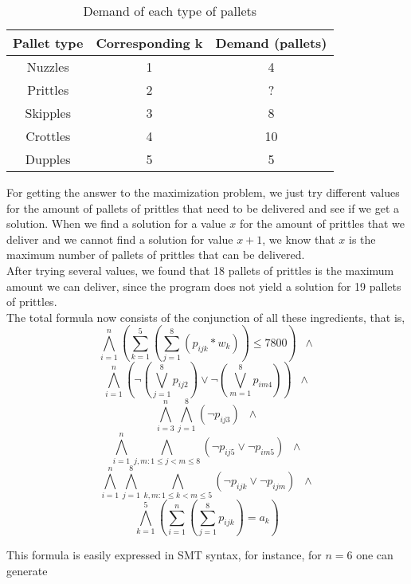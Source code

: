 \documentclass[a4paper]{article}
\begin{document}
\begin{table}[H]
\centering
\caption{Demand of each type of pallets}
\label{my-label}
\begin{tabular}{c|c|c}
\textbf{Pallet type} & \textbf{Corresponding k} & \textbf{Demand (pallets)} \\ \hline
Nuzzles              & 1                        & 4                  		\\ \hline
Prittles             & 2                        & ?                  		\\ \hline
Skipples             & 3                        & 8                 		\\ \hline
Crottles             & 4                        & 10                 		\\ \hline
Dupples              & 5                        & 5                 
\end{tabular}
\end{table}

For getting the answer to the maximization problem, we just try different values for the amount of pallets of prittles that need to be delivered and see if we get a solution. When we find a solution for a value $x$ for the amount of prittles that we deliver and we cannot find a solution for value $x+1$, we know that $x$ is the maximum number of pallets of prittles that can be delivered.\\

After trying several values, we found that 18 pallets of prittles is the maximum amount we can deliver, since the program does not yield a solution for 19 pallets of prittles.\\

The total formula now consists of the conjunction of all these ingredients, that is,
\[ \bigwedge_{i=1}^n (\sum_{k=1}^5 (\sum_{j=1}^8 (p_{ijk}*w_k)) \leq 7800) \;\; \wedge \]
\[ \bigwedge_{i=1}^n (\neg (\bigvee_{j=1}^8 p_{ij2}) \vee \neg (\bigvee_{m=1}^8 p_{im4})) \;\; \wedge \]
\[ \bigwedge_{i=3}^n \bigwedge_{j=1}^8 (\neg p_{ij3}) \;\; \wedge \]
\[ \bigwedge_{i=1}^n \bigwedge_{j,m:1 \leq j < m \leq 8} (\neg p_{ij5} \vee \neg p_{im5}) \;\; \wedge \]
\[ \bigwedge_{i=1}^n \bigwedge_{j=1}^8 \bigwedge_{k,m:1 \leq k < m \leq 5} (\neg p_{ijk} \vee \neg p_{ijm}) \;\; \wedge \]
\[ \bigwedge_{k=1}^5 ( \sum_{i=1}^n ( \sum_{j=1}^8 p_{ijk} ) = a_k) \]


This formula is easily expressed in SMT syntax, for instance, for $n=6$ one can generate
\end{document}
